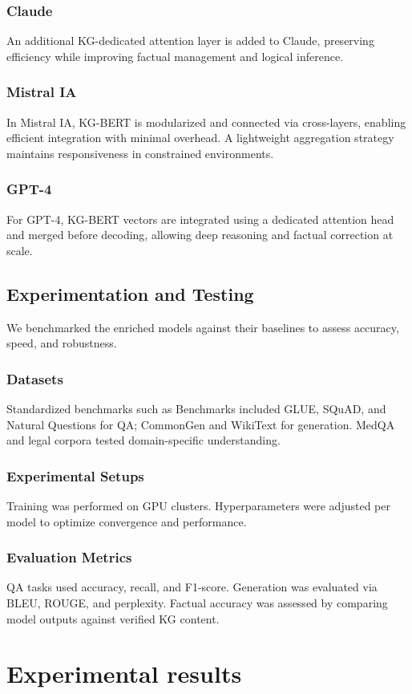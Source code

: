 \documentclass[conference]{IEEEtran}
\begin{document}
\subsubsection{Claude} 
An additional KG-dedicated attention layer is added to Claude, preserving efficiency while improving factual management and logical inference.
\subsubsection{Mistral IA} 
In Mistral IA, KG-BERT is modularized and connected via cross-layers, enabling efficient integration with minimal overhead. A lightweight aggregation strategy maintains responsiveness in constrained environments.
\subsubsection{GPT-4} 
For GPT-4, KG-BERT vectors are integrated using a dedicated attention head and merged before decoding, allowing deep reasoning and factual correction at scale.

\subsection{Experimentation and Testing}
We benchmarked the enriched models against their baselines to assess accuracy, speed, and robustness.

\subsubsection{Datasets} Standardized benchmarks such as Benchmarks included GLUE, SQuAD, and Natural Questions for QA; CommonGen and WikiText for generation. MedQA and legal corpora tested domain-specific understanding.
\subsubsection{Experimental Setups} Training was performed on GPU clusters. Hyperparameters were adjusted per model to optimize convergence and performance.
\subsubsection{Evaluation Metrics} QA tasks used accuracy, recall, and F1-score. Generation was evaluated via BLEU, ROUGE, and perplexity. Factual accuracy was assessed by comparing model outputs against verified KG content.

\section{Experimental results}
\label{sec:EXP}
\end{document}
